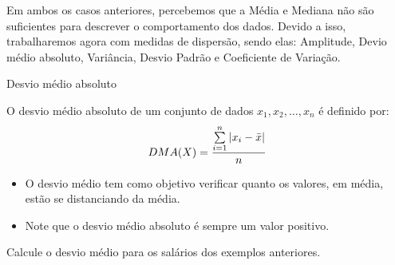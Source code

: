 \begin{frame}
Em ambos os casos anteriores, percebemos que a Média e Mediana não são suficientes para descrever o comportamento dos dados. Devido a isso, 
trabalharemos agora com medidas de dispersão, sendo elas: Amplitude, Devio médio absoluto, Variância, Desvio Padrão e Coeficiente de Variação.
\end{frame}




\begin{frame}{Desvio médio absoluto}

 O desvio médio absoluto de um conjunto de dados $x_1, x_2, \dots, x_n$ é definido por:
$$DMA(X) = \dfrac{\sum\limits_{i=1}^n |x_i - \Bar{x}|}{n}$$

\pause 
\begin{itemize}
    \item O desvio médio tem como objetivo verificar quanto os valores, em média, estão se distanciando da média.
    \pause
    \item Note que o desvio médio absoluto é sempre um valor positivo. 
\end{itemize}
\pause
\begin{exemplo}
    Calcule o desvio médio para os salários dos exemplos anteriores. 
\end{exemplo}    

\end{frame}

